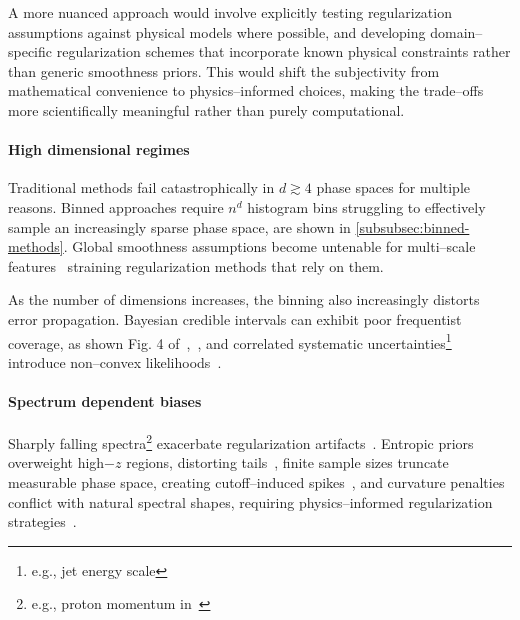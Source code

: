             A more nuanced approach would involve explicitly testing regularization assumptions against physical models where possible, and developing domain--specific regularization schemes that incorporate known physical constraints rather than generic smoothness priors.
            This would shift the subjectivity from mathematical convenience to physics--informed choices, making the trade--offs more scientifically meaningful rather than purely computational.

        \paragraph{High dimensional regimes}  
            Traditional methods fail catastrophically in \(d \gtrsim 4\) phase spaces for multiple reasons.
            Binned approaches require \(n^d\) histogram bins struggling to effectively sample an increasingly sparse phase space, are shown in \cref{subsubsec:binned-methods}.
            Global smoothness assumptions become untenable for multi--scale features~\cite{fernandez-martinez_curse_2020, xia_bayesian_2022, hocker_svd_1996} straining regularization methods that rely on them. 

            As the number of dimensions increases, the binning also increasingly distorts error propagation. 
            Bayesian credible intervals can exhibit poor frequentist coverage, as shown Fig. 4 of~\cite{Zhang2006AIntervals},~\cite{eberly_estimating_2003, szabo_frequentist_2015}, and correlated systematic uncertainties\footnote{e.g., jet energy scale} introduce non--convex likelihoods~\cite{berger_simplified_2023, Berger2017LectureATLAS}.

        \paragraph{Spectrum dependent biases}  
            Sharply falling spectra\footnote{e.g., proton momentum in~\cite{arnison_transverse_1982}} exacerbate regularization artifacts~\cite{gaponenko_practical_2020}.
            Entropic priors overweight high\(-z\) regions, distorting tails~\cite{caticha_entropic_2004, rodriguez_entropic_2002, Handley2019Maximum-EntropyDistribution, brewer_entropic_2009},
            finite sample sizes truncate measurable phase space, creating cutoff--induced spikes~\cite{finotello_functional_2025, marchand_bayesian_2012},
            and curvature penalties conflict with natural spectral shapes, requiring physics--informed regularization strategies~\cite{lee_explicit_2023, moosavi-dezfooli_robustness_2018, zech_analysis_2016, Baron2020ExtendingMethod}.  

